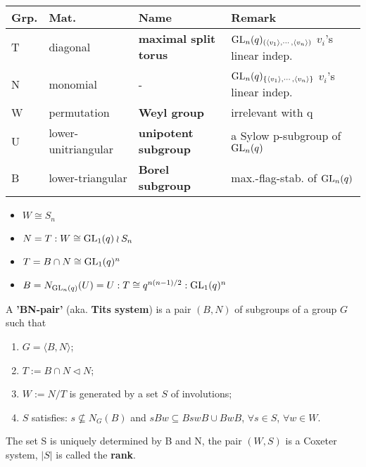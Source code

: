 \documentclass[a4paper,11pt]{article}
\begin{document}
\begin{table*}[htbp]
    \centering
    \begin{tabular}{llll}
        \toprule
        Grp. & Mat. & Name & Remark\\
        \midrule
        T & diagonal  & \textbf{maximal split torus} &  $\mathrm{GL}_n(q)_{(\langle v_1\rangle,\cdots,\langle v_n\rangle)}$ $v_i$'s linear indep.\\
        N & monomial & - & $\mathrm{GL}_n(q)_{\{\langle v_1\rangle,\cdots,\langle v_n\rangle\}}$ $v_i$'s linear indep.\\
        W & permutation  & \textbf{Weyl group} & irrelevant with q\\
        U & lower-unitriangular & \textbf{unipotent subgroup} & a Sylow p-subgroup of $\mathrm{GL}_n(q)$ \\
        B & lower-triangular & \textbf{Borel subgroup} & max.-flag-stab. of $\mathrm{GL}_n(q)$ \\
        \bottomrule
    \end{tabular}
    \label{matsubgp}
\end{table*}
\begin{itemize}[itemsep=0pt,label=-]
    \item $W\cong S_n$
    \item $N=T:W\cong \mathrm{GL}_1(q)\wr S_n$
    \item $T=B\cap N\cong \mathrm{GL}_1(q)^n$
    \item $B=N_{\mathrm{GL}_n(q)}(U)=U:T\cong q^{n(n-1)/2}:\mathrm{GL}_1(q)^n$
\end{itemize}

\begin{definition}
    A \textbf{'BN-pair'} (aka. \textbf{Tits system}) is a pair $(B,N)$ of subgroups of a group $G$ such that
    \begin{enumerate}[itemsep=0pt,label=(\roman*)]
        \item $G=\langle B,N\rangle$;
        \item $T:=B\cap N\triangleleft N$;
        \item $W:=N/T$ is generated by a set $S$ of involutions;
        \item $S$ satisfies: $s\not\subseteq N_G(B)$ and $sBw\subseteq BswB\cup BwB$, $\forall s\in S$, $\forall w\in W$.  
    \end{enumerate}
\end{definition}

The set S is uniquely determined by B and N, the pair $(W,S)$ is a Coxeter system, $|S|$ is called the \textbf{rank}.
\end{document}
